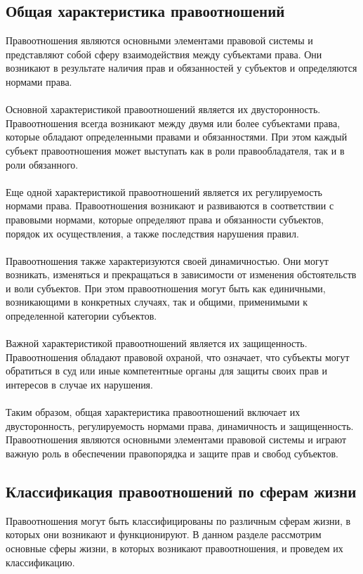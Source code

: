 \documentclass{article}
\begin{document}
\subsection{Общая характеристика правоотношений}
Правоотношения являются основными элементами правовой системы и представляют собой сферу взаимодействия между субъектами права. Они возникают в результате наличия прав и обязанностей у субъектов и определяются нормами права.\\
~\\
Основной характеристикой правоотношений является их двусторонность. Правоотношения всегда возникают между двумя или более субъектами права, которые обладают определенными правами и обязанностями. При этом каждый субъект правоотношения может выступать как в роли правообладателя, так и в роли обязанного.\\
~\\
Еще одной характеристикой правоотношений является их регулируемость нормами права. Правоотношения возникают и развиваются в соответствии с правовыми нормами, которые определяют права и обязанности субъектов, порядок их осуществления, а также последствия нарушения правил.\\
~\\
Правоотношения также характеризуются своей динамичностью. Они могут возникать, изменяться и прекращаться в зависимости от изменения обстоятельств и воли субъектов. При этом правоотношения могут быть как единичными, возникающими в конкретных случаях, так и общими, применимыми к определенной категории субъектов.\\
~\\
Важной характеристикой правоотношений является их защищенность. Правоотношения обладают правовой охраной, что означает, что субъекты могут обратиться в суд или иные компетентные органы для защиты своих прав и интересов в случае их нарушения.\\
~\\
Таким образом, общая характеристика правоотношений включает их двусторонность, регулируемость нормами права, динамичность и защищенность. Правоотношения являются основными элементами правовой системы и играют важную роль в обеспечении правопорядка и защите прав и свобод субъектов.
\subsection{Классификация правоотношений по сферам жизни}
Правоотношения могут быть классифицированы по различным сферам жизни, в которых они возникают и функционируют. В данном разделе рассмотрим основные сферы жизни, в которых возникают правоотношения, и проведем их классификацию.
\end{document}
